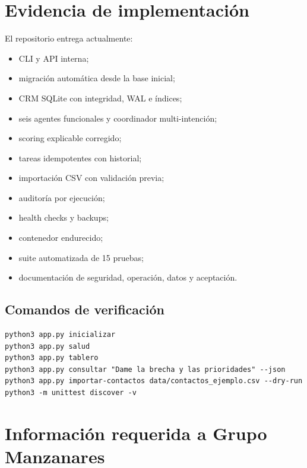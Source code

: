 \documentclass[11pt,a4paper]{article}
\begin{document}
\section{Evidencia de implementación}

El repositorio entrega actualmente:

\begin{itemize}
  \item CLI y API interna;
  \item migración automática desde la base inicial;
  \item CRM SQLite con integridad, WAL e índices;
  \item seis agentes funcionales y coordinador multi-intención;
  \item scoring explicable corregido;
  \item tareas idempotentes con historial;
  \item importación CSV con validación previa;
  \item auditoría por ejecución;
  \item health checks y backups;
  \item contenedor endurecido;
  \item suite automatizada de 15 pruebas;
  \item documentación de seguridad, operación, datos y aceptación.
\end{itemize}

\subsection{Comandos de verificación}

\begin{lstlisting}
python3 app.py inicializar
python3 app.py salud
python3 app.py tablero
python3 app.py consultar "Dame la brecha y las prioridades" --json
python3 app.py importar-contactos data/contactos_ejemplo.csv --dry-run
python3 -m unittest discover -v
\end{lstlisting}

\section{Información requerida a Grupo Manzanares}
\end{document}
